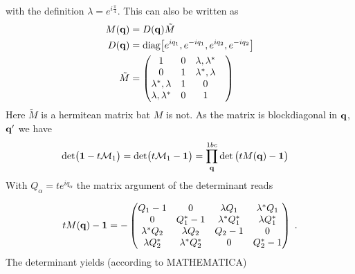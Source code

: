 with the definition $\lambda=e^{i\tfrac{\pi}{4}}$.
This can also be written as
%
\begin{subequations}\label{eq:}
\begin{align}
M(\mathbf q) &=  D(\mathbf q) \tilde M\\
D(\mathbf q) &=\text{diag} \big[ e^{i q_{1}},e^{-i q_{1}},e^{i q_{2}} ,e^{-i q_{2}}\big]\\
\tilde M &=
\begin{pmatrix}
	1&0&\lambda,\lambda^{*}\\
		0&1&\lambda^{*},\lambda\\
\lambda^{*},\lambda&	1&0&\\
\lambda,\lambda^{*}&	0&1&
\end{pmatrix}
\end{align}
\end{subequations}
%
Here $\tilde M$ is a hermitean matrix bat $M$ is not.
As the matrix is blockdiagonal in $\mathbf q$, $\mathbf q'$ we have
%
\begin{align*}
\text{det} \big(\mathbf 1- t {\cal M}_{1} \big)=\text{det} \big(t {\cal M}_{1} - \mathbf 1 \big)
&=\prod_{\mathbf q}^{1bc} \det\big( t M(\mathbf q)  - \mathbf 1 \big)
\end{align*}
%
With $Q_{\alpha}=t e^{iq_{\alpha}}$ the matrix  argument of the determinant reads
%


%
\begin{align*}
  t M(\mathbf q) - \mathbf 1=
- \begin{pmatrix}
Q_{1}-1& 0& \lambda Q_{1}& \lambda^{*} Q_{1}\\
0& Q_{1}^{*}-1&\lambda^{*}Q_{1}^{*}& \lambda Q_{1}^{*}\\
\lambda^{*}Q_{2}&\lambda Q_{2}&Q_{2}-1& 0\\
 \lambda Q_{2}^{*}& \lambda^{*}Q_{2}^{*}& 0& Q_{2}^{*}-1
\end{pmatrix}\;.
\end{align*}
%
The determinant  yields (according to MATHEMATICA)

